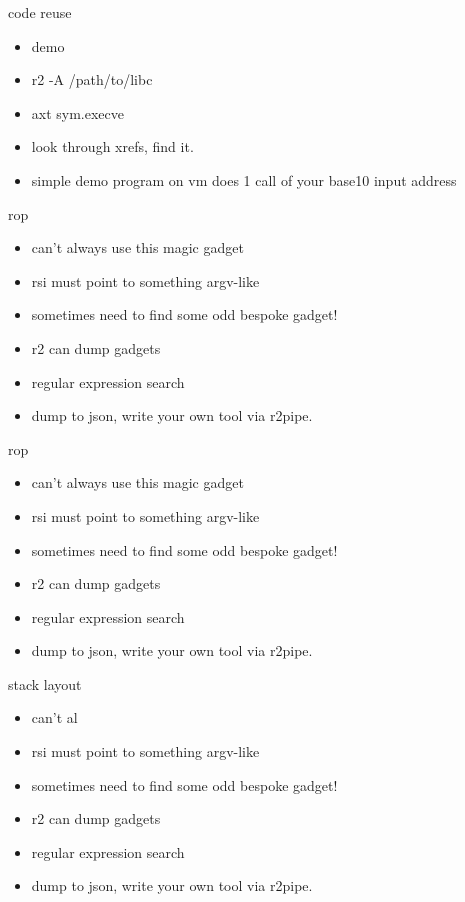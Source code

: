 \documentclass[10pt,pdf,utf8,english,compress,hyperref={unicode}]{beamer}
\begin{document}
\begin{frame}{code reuse}
	\begin{itemize}
		\item demo
		\item r2 -A /path/to/libc
		\item axt sym.execve
		\item look through xrefs, find it.
		\item simple demo program on vm does 1 call of your base10 input address
	\end{itemize}
\end{frame}

\begin{frame}{rop}
	\begin{itemize}
		\item can't always use this magic gadget
		\item rsi must point to something argv-like
		\item sometimes need to find some odd bespoke gadget!
		\item r2 can dump gadgets
		\item regular expression search
		\item dump to json, write your own tool via r2pipe.
	\end{itemize}
\end{frame}

\begin{frame}{rop}
	\begin{itemize}
		\item can't always use this magic gadget
		\item rsi must point to something argv-like
		\item sometimes need to find some odd bespoke gadget!
		\item r2 can dump gadgets
		\item regular expression search
		\item dump to json, write your own tool via r2pipe.
	\end{itemize}
\end{frame}

\begin{frame}{stack layout}
	\begin{itemize}
		\item can't al
		\item rsi must point to something argv-like
		\item sometimes need to find some odd bespoke gadget!
		\item r2 can dump gadgets
		\item regular expression search
		\item dump to json, write your own tool via r2pipe.
	\end{itemize}
\end{frame}
\end{document}
